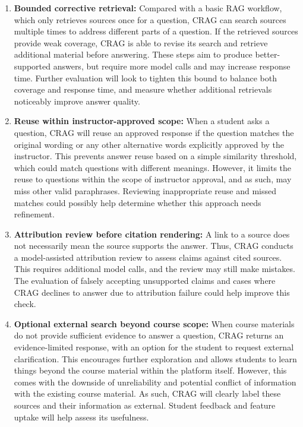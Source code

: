\begin{enumerate}[label=\textbf{TC\arabic*.}]
\item \textbf{Bounded corrective retrieval:}  Compared with a basic RAG workflow, which only retrieves sources once for a question, CRAG can search sources multiple times to address different parts of a question. If the retrieved sources provide weak coverage, CRAG is able to revise its search and retrieve additional material before answering. These steps aim to produce better-supported answers, but require more model calls and may increase response time. Further evaluation will look to tighten this bound to balance both coverage and response time, and measure whether additional retrievals noticeably improve answer quality.

\item \textbf{Reuse within instructor-approved scope:} When a student asks a question, CRAG will reuse an approved response if the question matches the original wording or any other alternative words explicitly approved by the instructor. This prevents answer reuse based on a simple similarity threshold, which could match questions with different meanings. However, it limits the reuse to questions within the scope of instructor approval, and as such, may miss other valid paraphrases. Reviewing inappropriate reuse and missed matches could possibly help determine whether this approach needs refinement.

\item \textbf{Attribution review before citation rendering:} A link to a source does not necessarily mean the source supports the answer. Thus, CRAG conducts a model-assisted attribution review to assess claims against cited sources. This requires additional model calls, and the review may still make mistakes. The evaluation of falsely accepting unsupported claims and cases where CRAG declines to answer due to attribution failure could help improve this check.

\item \textbf{Optional external search beyond course scope:} When course materials do not provide sufficient evidence to answer a question, CRAG returns an evidence-limited response, with an option for the student to request external clarification. This encourages further exploration and allows students to learn things beyond the course material within the platform itself. However, this comes with the downside of unreliability and potential conflict of information with the existing course material. As such, CRAG will clearly label these sources and their information as external. Student feedback and feature uptake will help assess its usefulness.
\end{enumerate}

